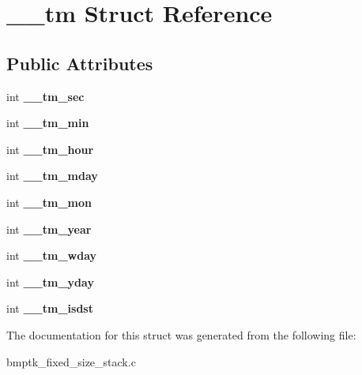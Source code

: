 \hypertarget{struct____tm}{}\section{\+\_\+\+\_\+tm Struct Reference}
\label{struct____tm}
\subsection*{Public Attributes}
\begin{DoxyCompactItemize}
\item 
int {\bfseries \+\_\+\+\_\+tm\+\_\+sec}\hypertarget{struct____tm_a69ef177ba38ea151f7b0c2cfcbf1ee39}{}\label{struct____tm_a69ef177ba38ea151f7b0c2cfcbf1ee39}

\item 
int {\bfseries \+\_\+\+\_\+tm\+\_\+min}\hypertarget{struct____tm_a5f4926bbac948f243c54ec11f9088d0f}{}\label{struct____tm_a5f4926bbac948f243c54ec11f9088d0f}

\item 
int {\bfseries \+\_\+\+\_\+tm\+\_\+hour}\hypertarget{struct____tm_aa5ccd16dc9f25c423c984b2e3b4c641e}{}\label{struct____tm_aa5ccd16dc9f25c423c984b2e3b4c641e}

\item 
int {\bfseries \+\_\+\+\_\+tm\+\_\+mday}\hypertarget{struct____tm_a9e5e11beb96f3f45818f9a6bb335c47d}{}\label{struct____tm_a9e5e11beb96f3f45818f9a6bb335c47d}

\item 
int {\bfseries \+\_\+\+\_\+tm\+\_\+mon}\hypertarget{struct____tm_aeb3ae3ec35a3c1c71cad5cdeac56750a}{}\label{struct____tm_aeb3ae3ec35a3c1c71cad5cdeac56750a}

\item 
int {\bfseries \+\_\+\+\_\+tm\+\_\+year}\hypertarget{struct____tm_a72272e255ca867203495da729919a53d}{}\label{struct____tm_a72272e255ca867203495da729919a53d}

\item 
int {\bfseries \+\_\+\+\_\+tm\+\_\+wday}\hypertarget{struct____tm_a80be7915bde98fd1bbdacc5fa27f83f2}{}\label{struct____tm_a80be7915bde98fd1bbdacc5fa27f83f2}

\item 
int {\bfseries \+\_\+\+\_\+tm\+\_\+yday}\hypertarget{struct____tm_ab7967ab1376a4305507472e99ef1927a}{}\label{struct____tm_ab7967ab1376a4305507472e99ef1927a}

\item 
int {\bfseries \+\_\+\+\_\+tm\+\_\+isdst}\hypertarget{struct____tm_aaf70306864dde024c0ca5d8f14d24a14}{}\label{struct____tm_aaf70306864dde024c0ca5d8f14d24a14}

\end{DoxyCompactItemize}


The documentation for this struct was generated from the following file\+:\begin{DoxyCompactItemize}
\item 
bmptk\+\_\+fixed\+\_\+size\+\_\+stack.\+c\end{DoxyCompactItemize}
